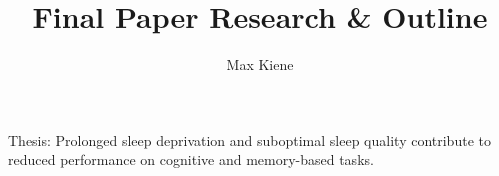 \documentclass[stu, man]{apa7}
\title{Final Paper Research \& Outline}
\author{Max Kiene}
\begin{document}
\maketitle

\tableofcontents

\newpage

Thesis: Prolonged sleep deprivation and suboptimal sleep quality contribute to reduced performance on cognitive and memory-based tasks.











\printbibliography
\end{document}
